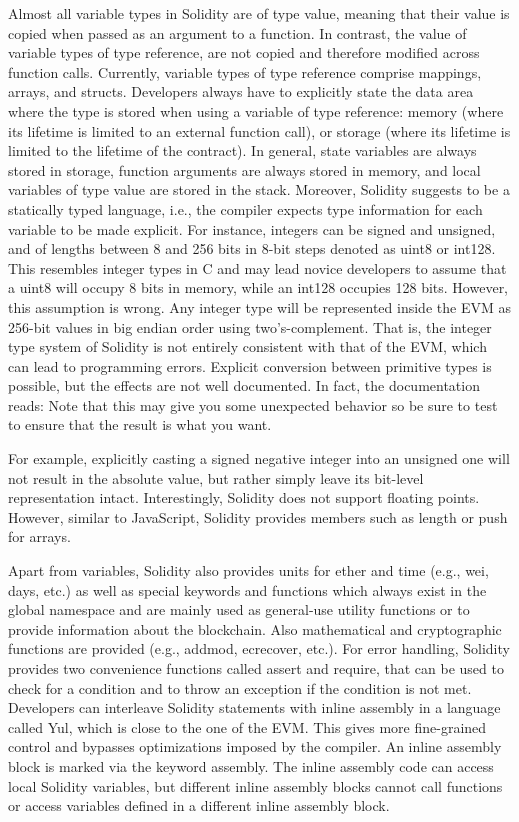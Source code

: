         Almost all variable types in Solidity are of type value, meaning that their value is copied when passed as an argument to a function.
        In contrast, the value of variable types of type reference, are not copied and therefore modified across function calls.
        Currently, variable types of type reference comprise mappings, arrays, and structs.
        Developers always have to explicitly state the data area where the type is stored when using a variable of type reference: memory (where its lifetime is limited to an external function call), or storage (where its lifetime is limited to the lifetime of the contract).
        In general, state variables are always stored in storage, function arguments are always stored in memory, and local variables of type value are stored in the stack.
        Moreover, Solidity suggests to be a statically typed language, i.e., the compiler expects type information for each variable to be made explicit.
        For instance, integers can be signed and unsigned, and of lengths between 8 and 256 bits in 8-bit steps denoted as uint8 or int128.
        This resembles integer types in C and may lead novice developers to assume that a uint8 will occupy 8 bits in memory, while an int128 occupies 128 bits.
        However, this assumption is wrong. Any integer type will be represented inside the EVM as 256-bit values in big endian order using two's-complement.
        That is, the integer type system of Solidity is not entirely consistent with that of the EVM, which can lead to programming errors.
        Explicit conversion between primitive types is possible, but the effects are not well documented.
        In fact, the documentation reads: Note that this may give you some unexpected behavior so be sure to test to ensure that the result is what you want.

        For example, explicitly casting a signed negative integer into an unsigned one will not result in the absolute value, but rather simply leave its bit-level representation intact.
        Interestingly, Solidity does not support floating points.
        However, similar to JavaScript, Solidity provides members such as length or push for arrays.

        Apart from variables, Solidity also provides units for ether and time (e.g., wei, days, etc.) as well as special keywords and functions which always exist in the global namespace and are mainly used as general-use utility functions or to provide information about the blockchain.
        Also mathematical and cryptographic functions are provided (e.g., addmod, ecrecover, etc.).
        For error handling, Solidity provides two convenience functions called assert and require, that can be used to check for a condition and to throw an exception if the condition is not met.
        Developers can interleave Solidity statements with inline assembly in a language called Yul, which is close to the one of the EVM.
        This gives more fine-grained control and bypasses optimizations imposed by the compiler.
        An inline assembly block is marked via the keyword assembly.
        The inline assembly code can access local Solidity variables, but different inline assembly blocks cannot call functions or access variables defined in a different inline assembly block.

